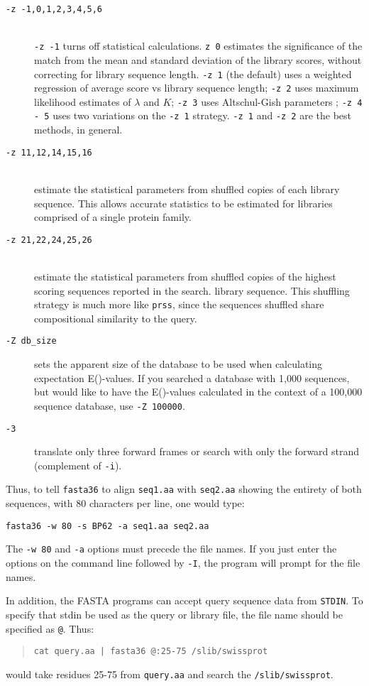 \documentclass[11pt]{article}
\begin{document}
\begin{description}
\item[\texttt{-z -1,0,1,2,3,4,5,6}]\hfill\\
\texttt{-z -1} turns off statistical calculations. \texttt{z 0} estimates
the significance of the match from the mean and standard deviation of
the library scores, without correcting for library sequence length.
\texttt{-z 1} (the default) uses a weighted regression of average score
vs library sequence length; \texttt{-z 2} uses maximum likelihood
estimates of $\lambda$
and $K$; \texttt{-z 3} uses Altschul-Gish parameters \cite{alt960};
\texttt{-z 4 - 5} uses two variations on the \texttt{-z 1}
strategy. \texttt{-z 1} and \texttt{-z 2} are the best methods, in
general.
\item[\texttt{-z 11,12,14,15,16}]\hfill\\
estimate the statistical parameters from shuffled copies of each
library sequence.  This allows accurate statistics to be estimated for libraries comprised of a single protein family.

\item[\texttt{-z 21,22,24,25,26}]\hfill\\
estimate the statistical parameters from shuffled copies of the
highest scoring sequences reported in the search.
library sequence. This shuffling strategy is much more like
\texttt{prss}, since the sequences shuffled share compositional
similarity to the query.
\item[\texttt{-Z db\_size}]
sets the apparent size of the database to be used when calculating
expectation E()-values.  If you searched a database with 1,000
sequences, but would like to have the E()-values calculated in the
context of a 100,000 sequence database, use \texttt{-Z 100000}.
\item[\texttt{-3}]
translate only three forward frames or search with only the forward
strand (complement of \texttt{-i}).
\end{description}

Thus, to tell \texttt{fasta36} to align \texttt{seq1.aa} with \texttt{seq2.aa} showing the entirety of both sequences, with 80 characters per line, one would type:
\begin{verbatim}
fasta36 -w 80 -s BP62 -a seq1.aa seq2.aa
\end{verbatim}
The \texttt{-w 80} and \texttt{-a} options must precede the file
names.  If you just enter the options on the command line followed by
\texttt{-I}, the program will prompt for the file names.

In addition, the FASTA programs can accept query sequence data from
\texttt{STDIN}.  To specify that stdin be used as the query or library
file, the file name should be specified as \texttt{@}.  Thus:
\begin{quote}
\texttt{cat query.aa | fasta36 @:25-75 /slib/swissprot }
\end{quote}
would take residues 25-75 from \texttt{query.aa} and search the
\texttt{/slib/swissprot}.
\end{document}
